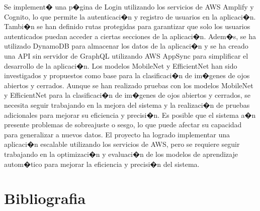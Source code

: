 \documentclass[12pt,letterpaper]{article}
\begin{document}
Se implement� una p�gina de Login utilizando los servicios de AWS Amplify y Cognito, lo que permite la autenticaci�n y registro de usuarios en la aplicaci�n. Tambi�n se han definido rutas protegidas para garantizar que solo los usuarios autenticados puedan acceder a ciertas secciones de la aplicaci�n. Adem�s, se ha utilizado DynamoDB para almacenar los datos de la aplicaci�n y se ha creado una API sin servidor de GraphQL utilizando AWS AppSync para simplificar el desarrollo de la aplicaci�n. Los modelos MobileNet y EfficientNet han sido investigados y propuestos como base para la clasificaci�n de im�genes de ojos abiertos y cerrados. Aunque se han realizado pruebas con los modelos MobileNet y EfficientNet para la clasificaci�n de im�genes de ojos abiertos y cerrados, se necesita seguir trabajando en la mejora del sistema y la realizaci�n de pruebas adicionales para mejorar su eficiencia y precisi�n. Es posible que el sistema a�n presente problemas de sobreajuste o sesgo, lo que puede afectar su capacidad para generalizar a nuevos datos. El proyecto ha logrado implementar una aplicaci�n escalable utilizando los servicios de AWS, pero se requiere seguir trabajando en la optimizaci�n y evaluaci�n de los modelos de aprendizaje autom�tico para mejorar la eficiencia y precisi�n del sistema.


\newpage
\section{Bibliografia}
%
\end{document}
